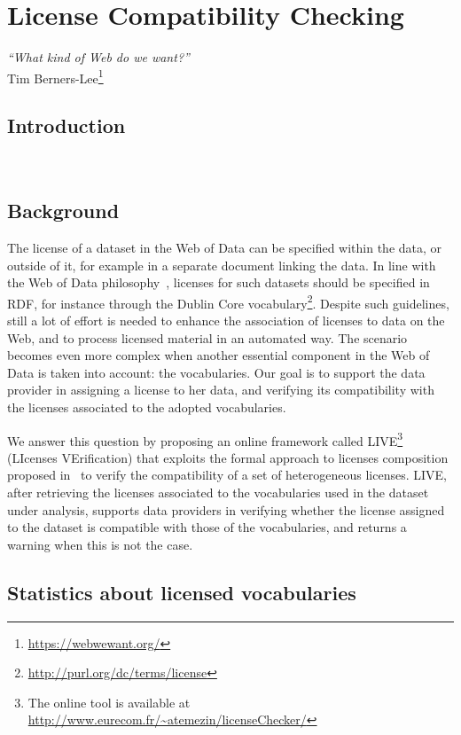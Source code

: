 
\chapter{License Compatibility Checking}
\label{ch:ch7}
\begin{flushright}
\textit{``What kind of Web do we want?''} \\
 Tim Berners-Lee\footnote{\url{https://webwewant.org/}}
 \end{flushright}
 

\section*{Introduction}
 \\

\section{Background}
The license of a dataset in the Web of Data can be specified within the data, or outside of it, for example in a separate document linking the data. In line with the Web of Data philosophy~\cite{LinkedData2011}, licenses for such datasets should be specified in RDF, for instance through the Dublin Core vocabulary\footnote{\url{http://purl.org/dc/terms/license}}. Despite such guidelines, still a lot of effort is needed to enhance the association of licenses to data on the Web, and to process licensed material in an automated way. The scenario becomes even more complex when another essential component in the Web of Data is taken into account: the vocabularies. Our goal is to support the data provider in assigning a license to her data, and verifying its compatibility with the licenses associated to the adopted vocabularies.      


%
We answer this question by proposing an online framework called LIVE\footnote{The online tool is available at \url{http://www.eurecom.fr/~atemezin/licenseChecker/}} (LIcenses VErification) that exploits the formal approach to licenses composition proposed in~\cite{DBLP:conf/semweb/GovernatoriRVG13} to verify the compatibility of a set of heterogeneous licenses. LIVE, after retrieving the licenses associated to the vocabularies used in the dataset under analysis, supports data providers in verifying whether the license assigned to the dataset is compatible with those of the vocabularies, and returns a warning when this is not the case. 

\section{Statistics about licensed vocabularies}
\label{sec:stats-license}

